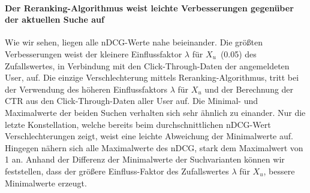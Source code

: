 \paragraph{Der Reranking-Algorithmus weist leichte Verbesserungen gegenüber der aktuellen Suche auf}
Wie wir sehen, liegen alle nDCG-Werte nahe beieinander. Die größten Verbesserungen weist der kleinere Einflussfaktor $\lambda$ für $X_u$~(0.05) des Zufallswertes, in Verbindung mit den Click-Through-Daten der angemeldeten User, auf. Die einzige Verschlechterung mittels Reranking-Algorithmus, tritt bei der Verwendung des höheren Einflussfaktors $\lambda$ für $X_u$ und der Berechnung der CTR aus den Click-Through-Daten aller User auf. Die Minimal- und Maximalwerte der beiden Suchen verhalten sich sehr ähnlich zu einander. Nur die letzte Konstellation, welche bereits beim durchschnittlichen nDCG-Wert Verschlechterungen zeigt, weist eine leichte Abweichung der Minimalwerte auf. Hingegen nähern sich alle Maximalwerte des nDCG, stark dem Maximalwert von 1 an. Anhand der Differenz der Minimalwerte der Suchvarianten können wir feststellen, dass der größere Einfluss-Faktor des Zufallswertes $\lambda$ für $X_u$, bessere Minimalwerte erzeugt.
